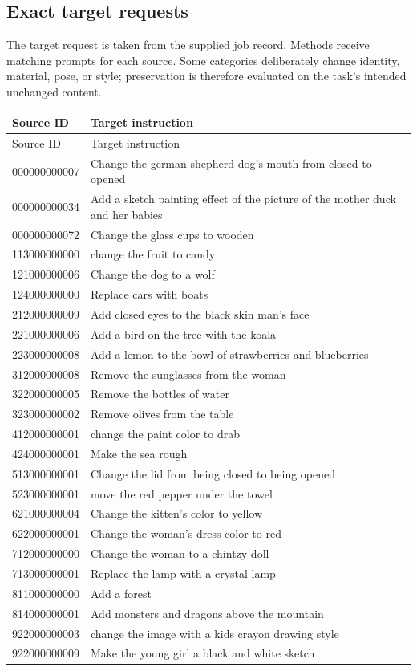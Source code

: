 \subsection{Exact target requests}
The target request is taken from the supplied job record. Methods receive matching prompts for each source. Some categories deliberately change identity, material, pose, or style; preservation is therefore evaluated on the task's intended unchanged content.
\small
\begin{longtable}{lp{}}
\toprule
Source ID & Target instruction\\\midrule\endfirsthead
\toprule Source ID & Target instruction\\\midrule\endhead
000000000007 & Change the german shepherd dog's mouth from closed to opened\\
000000000034 & Add a sketch painting effect of the picture of the mother duck and her babies\\
000000000072 & Change the glass cups to wooden\\
113000000000 & change the fruit to candy\\
121000000006 & Change the dog to a wolf\\
124000000000 & Replace cars with boats\\
212000000009 & Add closed eyes to the black skin man's face\\
221000000006 & Add a bird on the tree with the koala\\
223000000008 & Add a lemon to the bowl of strawberries and blueberries\\
312000000008 & Remove the sunglasses from the woman\\
322000000005 & Remove the bottles of water\\
323000000002 & Remove olives from the table\\
412000000001 & change the paint color to drab\\
424000000001 & Make the sea rough\\
513000000001 & Change the lid from being closed to being opened\\
523000000001 & move the red pepper under the towel\\
621000000004 & Change the kitten's color to yellow\\
622000000001 & Change the woman's dress color to red\\
712000000000 & Change the woman to a chintzy doll\\
713000000001 & Replace the lamp with a crystal lamp\\
811000000000 & Add a forest\\
814000000001 & Add monsters and dragons above the mountain\\
922000000003 & change the image with a kids crayon drawing style\\
922000000009 & Make the young girl a black and white sketch\\
\bottomrule\end{longtable}
\normalsize
